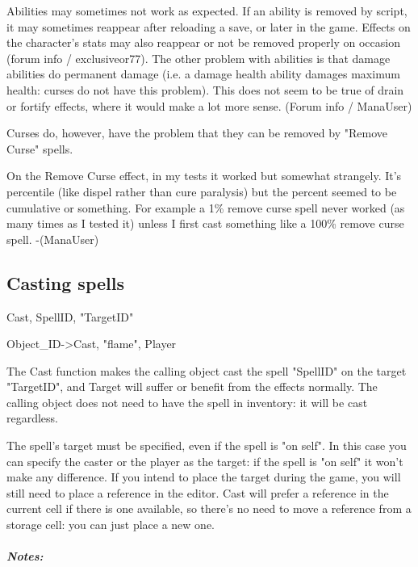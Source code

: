 \documentclass[
]{article}
\begin{document}
Abilities may sometimes not work as expected. If an ability is removed
by script, it may sometimes reappear after reloading a save, or later in
the game. Effects on the character's stats may also reappear or not be
removed properly on occasion (forum info / exclusiveor77). The other
problem with abilities is that damage abilities do permanent damage
(i.e. a damage health ability damages maximum health: curses do not have
this problem). This does not seem to be true of drain or fortify
effects, where it would make a lot more sense. (Forum info / ManaUser)

Curses do, however, have the problem that they can be removed by "Remove
Curse" spells.

On the Remove Curse effect, in my tests it worked but somewhat
strangely. It's percentile (like dispel rather than cure paralysis) but
the percent seemed to be cumulative or something. For example a 1\%
remove curse spell never worked (as many times as I tested it) unless I
first cast something like a 100\% remove curse spell. -(ManaUser)

\hypertarget{casting-spells}{%
\subsection{\texorpdfstring{\hfill\break
Casting spells}{ Casting spells}}\label{casting-spells}}

Cast, SpellID, "TargetID"

Object\_ID-\textgreater Cast, "flame", Player

The Cast function makes the calling object cast the spell "SpellID" on
the target "TargetID", and Target will suffer or benefit from the
effects normally. The calling object does not need to have the spell in
inventory: it will be cast regardless.

The spell's target must be specified, even if the spell is "on self". In
this case you can specify the caster or the player as the target: if the
spell is "on self" it won't make any difference. If you intend to place
the target during the game, you will still need to place a reference in
the editor. Cast will prefer a reference in the current cell if there is
one available, so there's no need to move a reference from a storage
cell: you can just place a new one.

\hypertarget{notes}{%
\subparagraph{Notes:}\label{notes}}
\end{document}
